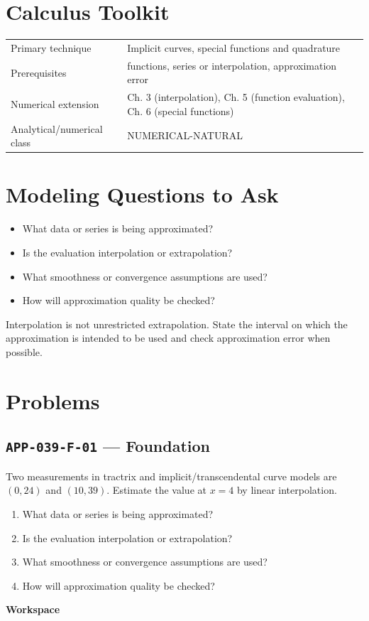 \documentclass[11pt]{book}
\newcommand{\pid}[1]{\texttt{#1}}
\newcommand{\workspace}{\par\vspace{0.7in}\hrulefill\par\vspace{0.55in}\hrulefill\par}
\begin{document}
\section*{Calculus Toolkit}
\begin{tabularx}{\textwidth}{@{}lX@{}}\toprule
Primary technique & Implicit curves, special functions and quadrature \\
Prerequisites & functions, series or interpolation, approximation error \\
Numerical extension & Ch. 3 (interpolation), Ch. 5 (function evaluation), Ch. 6 (special functions) \\
Analytical/numerical class & NUMERICAL-NATURAL \\
\bottomrule\end{tabularx}
\section*{Modeling Questions to Ask}\begin{itemize}
\item What data or series is being approximated?
\item Is the evaluation interpolation or extrapolation?
\item What smoothness or convergence assumptions are used?
\item How will approximation quality be checked?
\end{itemize}
\begin{errorbox}Interpolation is not unrestricted extrapolation. State the interval on which the approximation is intended to be used and check approximation error when possible.\end{errorbox}
\section*{Problems}
\subsection*{\pid{APP-039-F-01} — Foundation}
\begin{problembox}
Two measurements in tractrix and implicit/transcendental curve models are $(0,24)$ and $(10,39)$. Estimate the value at $x=4$ by linear interpolation.
\end{problembox}
\begin{promptbox}\begin{enumerate}
\item What data or series is being approximated?
\item Is the evaluation interpolation or extrapolation?
\item What smoothness or convergence assumptions are used?
\item How will approximation quality be checked?
\end{enumerate}\end{promptbox}
\textbf{Workspace}\workspace
{}
\end{document}
